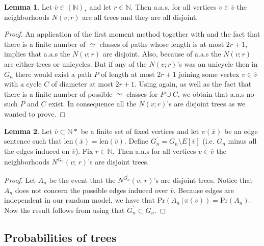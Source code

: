 \documentclass[12pt,notitlepage,a4paper]{article}
\theoremstyle{definition}
\newtheorem{lemma}{Lemma}[section]
\newcommand{\N}{\mathbb{N}}
\newcommand{\len}{\mathrm{len}}
\begin{document}
\begin{lemma} \label{lem:disjointtrees}
	Let $\overline{v}\in (\N)_*$ and let $r\in \N$. Then
	a.a.s, for all vertices $v\in \overline{v}$ the neighborhoods 
	$N(v;r)$ are all trees and they are all disjoint. 
	
	\begin{proof}
		An application of the first moment method together with
		 and the fact that there is a finite number
		of $\simeq$ classes of paths whose length is at most $2r+1$, implies that
		a.a.s the $N(v;r)$ are disjoint. 
		Also, because of  a.a.s the $N(v;r)$ are either 
		trees or unicycles. But if any of the $N(v;r)$'s was an unicycle then
		in $G_n$ there would exist a path $P$ of length at most
		$2r+1$ joining some vertex $v\in \overline{v}$
		with a cycle $C$ of diameter at most $2r+1$. Using 
		again, as well as the fact that there is a finite number of possible $\simeq$
		classes for
		$P\cup C$, we obtain that a.a.s no such $P$ and $C$ exist. 
		In consequence all the $N(v;r)$'s are disjoint trees as we wanted to
		prove. \end{proof}
\end{lemma}

\begin{lemma}\label{lem:far_away}
	Let $\overline{v} \subset \N*$ be a finite set of fixed vertices and let 
	$\pi(\overline{x})$ be an edge sentence such that
	$\len(\overline{x})=\len(\overline{v})$. 
	Define $G_n^\prime=G_n \setminus E[\overline{v}]$ (i.e. $G_n$ minus all the
	edges induced on $\overline{v}$). Fix $r\in \N$. 
	Then a.a.s for all vertices $v\in \overline{v}$ the neighborhoods
	$N^{G^\prime_n}(v;\,r)$'s are disjoint trees.  
\end{lemma}
\begin{proof}
	Let $A_n$ be the event that the $N^{G^\prime_n}(v;\,r)$'s are disjoint trees.  
	Notice that $A_n$ does not concern the possible edges
	induced over $\overline{v}$. Because edges are independent
	in our random model, we have that
	$\mathrm{Pr}\left(A_n \, | \, \pi(\overline{v})\right)
	=\mathrm{Pr}(A_n)$. Now the result follows from 
	 using that $G^\prime_n\subset G_n$.  
\end{proof}







\subsection{Probabilities of trees}
\end{document}
